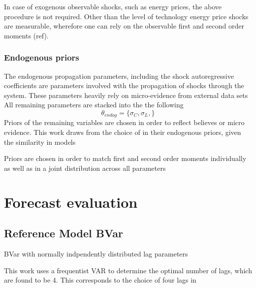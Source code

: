 \documentclass[12pt,a4paper,english]{article} %
\let\oldsection\section
\renewcommand\section{\clearpage\oldsection}
\begin{document}
	In case of exogenous observable shocks, such as energy prices, the above procedure is not required. Other than the level of technology energy price shocks are measurable, wherefore one can rely on the observable first and second order moments (ref).
	
	\subsubsection{Endogenous priors}
	The endogenous propagation parameters, including the shock autoregressive coefficients are parameters involved with the propagation of shocks through the system.
	These parameters heavily rely on micro-evidence from external data sets \cite{del_negro_forming_2008}
	All remaining parameters are stacked into the the following
	\[
		\theta_{endog} = \{\sigma_C, \sigma_L, \}
	\]
	Priors of the remaining variables are chosen in order to reflect believes or micro evidence. This work draws from the choice of \cite{del_negro_forming_2008} in their endogenous priors, given the similarity in models
	
	
	

	
		
	Priors are chosen in order to match first and second order moments individually as well as in a joint distribution across all parameters \cite{del_negro_forming_2008}
	


	
	
	
	
	\section{Forecast evaluation}
	
	\subsection{Reference Model BVar}
	\cite{schorfheide_loss_2000}
	
	BVar with normally indpendently distributed lag parameters \cite{chin_bayesian_2019}
	
	This work uses a frequentist VAR to determine the optimal number of lags, which are found to be 4. This corresponds to the choice of four lags in \cite{chin_bayesian_2019}
	
\end{document}
